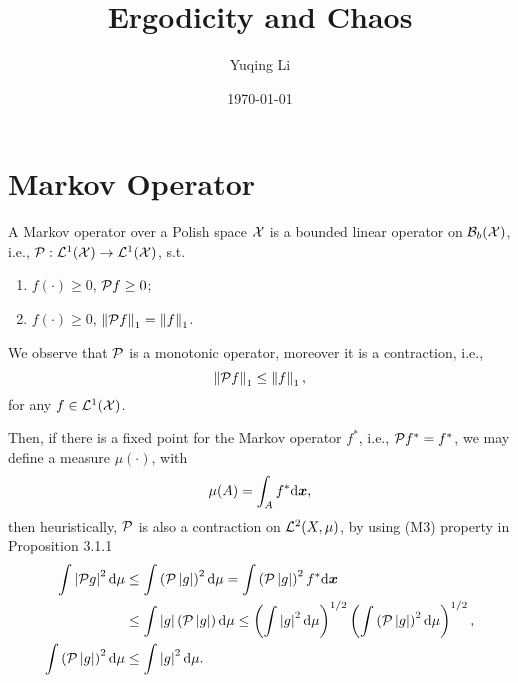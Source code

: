 \documentclass[12pt,a4]{article}
\begin{document}
\title{Ergodicity and Chaos}
\author{Yuqing Li}
\date{\today}
\maketitle
\allowdisplaybreaks
\linenumbers
\begin{abstract}

\end{abstract}
\section{Markov Operator}\label{Section...MarkovOperator}
\begin{defi}
  A Markov operator over   a Polish space $\mathcal{X}$ is a bounded linear operator on  $\mathcal{B}_b(\mathcal{X})$, i.e., $\mathcal{P}:\mathcal{L}^1(\mathcal{X})\to\mathcal{L}^1(\mathcal{X})$, s.t.
  \begin{enumerate}
      \item  $f(\cdot)\geq 0$, $\mathcal{P} f\geq 0$;
      \item $f(\cdot)\geq 0$, $\left\lVert\mathcal{P} f\right\rVert_1=\left\lVert f\right\rVert_1$.
  \end{enumerate}
  \end{defi}
We observe that $\mathcal{P}$ is a monotonic operator, moreover it is a contraction, i.e.,
\[
    \left\lVert\mathcal{P} f\right\rVert_1\leq \left\lVert f\right\rVert_1,
\]
for any $f\in\mathcal{L}^1(\mathcal{X})$.

Then, if there is a fixed point for the Markov operator $f^*$, i.e., $\mathcal{P} f^*=f^*$, we may define a measure $\mu(\cdot)$, with
\[
\mu(A)=\int_A  f^* \mathrm{d} \bm{x},
\]
then heuristically, $\mathcal{P}$ is also a contraction on $\mathcal{L}^2(X,\mu)$, by using (M3) property in Proposition 3.1.1~\cite{lasota1998chaos}
\begin{align*}
     \int \left\lvert\mathcal{P} g\right\rvert^2 \mathrm{d} \mu &\leq \int \left(\mathcal{P}\left\lvert g\right\rvert\right)^2\mathrm{d} \mu =\int \left(\mathcal{P}\left\lvert g\right\rvert\right)^2 f^*\mathrm{d} \bm{x} \\
     &\leq  \int\left\lvert g\right\rvert\left(\mathcal{P}\left\lvert g\right\rvert\right) \mathrm{d} \mu \leq \left(\int\left\lvert g\right\rvert^2\mathrm{d} \mu\right)^{1/2}\left(\int \left(\mathcal{P}\left\lvert g\right\rvert\right)^2 \mathrm{d} \mu\right)^{1/2},\\
     \int \left(\mathcal{P}\left\lvert g\right\rvert\right)^2 \mathrm{d} \mu&\leq \int\left\lvert g\right\rvert^2\mathrm{d} \mu.
\end{align*}
\end{document}
